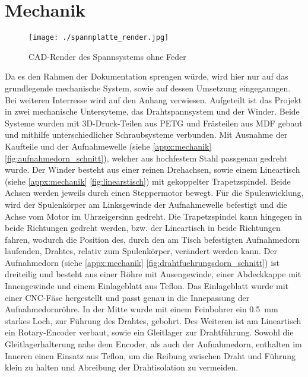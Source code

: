 \section{Mechanik}
\label{sec:Mechanik}






\begin{wrapfigure}{L}{0.3\textwidth}
    \centering
    \texttt{[image: ./spannplatte\_render.jpg]}
    \caption{CAD-Render des Spannsystems ohne Feder}
\end{wrapfigure}
Da es den Rahmen der Dokumentation sprengen würde, wird hier nur auf das grundlegende mechanische System, sowie auf dessen Umsetzung eingeganngen. Bei weiteren Interresse wird auf den Anhang verwiesen. Aufgeteilt ist das Projekt in zwei mechanische Untersyteme, das Drahtspannsystem und der Winder.\newline
Beide Systeme wurden mit 3D-Druck-Teilen aus PETG und Frästeilen aus MDF gebaut und mithilfe unterschiedlicher Schraubsysteme verbunden. Mit Ausnahme der Kaufteile und der Aufnahmewelle (siehe \autoref{appx:mechanik} \autoref{fig:aufnahmedorn_schnitt}), welcher aus hochfestem Stahl passgenau gedreht wurde.
\newline
Der Winder besteht aus einer reinen Drehachsen, sowie einem Lineartisch (siehe \autoref{appx:mechanik} \autoref{fig:linearstisch}) mit gekoppelter Trapetzspindel. Beide Achsen werden jeweils durch einen Steppermotor bewegt. Für die Spulenwicklung, wird der Spulenkörper am Linksgewinde der Aufnahmewelle befestigt und die Achse vom Motor im Uhrzeigersinn gedreht. Die Trapetzspindel kann hingegen in beide Richtungen gedreht werden, bzw. der Lineartisch in beide Richtungen fahren, wodurch die Position des, durch den am Tisch befestigten Aufnahmedorn laufenden, Drahtes, relativ zum Spulenkörper, verändert werden kann. Der Aufnahmedorn (siehe \autoref{appx:mechanik} \autoref{fig:drahtfuehrungsdorn_schnitt}) ist dreiteilig und besteht aus einer Röhre mit Ausengewinde, einer Abdeckkappe mit Innengewinde und einem Einlageblatt aus Teflon. Das Einlageblatt wurde mit einer CNC-Fäse hergestellt und passt genau in die Innepassung der Aufnahmedornröhre. In der Mitte wurde mit einem Feinbohrer ein 0.5~\si{\milli\metre} starkes Loch, zur Führung des Drahtes, gebohrt.
Des Weiteren ist am Lineartisch ein Rotary-Encoder verbaut, sowie ein Gleitlager zur Drahtführung. Sowohl die Gleitlagerhalterung nahe dem Encoder, als auch der Aufnahmedorn, enthalten im Inneren einen Einsatz aus Teflon, um die Reibung zwischen Draht und Führung klein zu halten und Abreibung der Drahtisolation zu vermeiden.\newline

